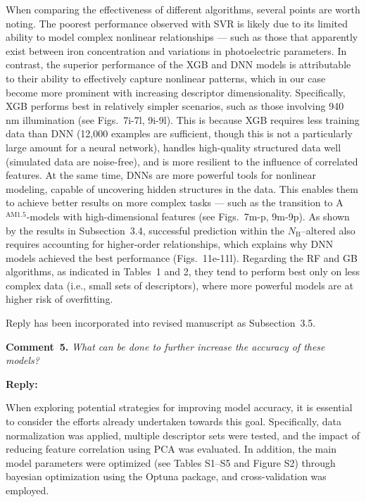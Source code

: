 \documentclass[a4paper,fleqn]{cas-sc}
\begin{document}
When comparing the effectiveness of different algorithms, several points are worth noting.
The poorest performance observed with SVR is likely due to its limited ability
to model complex nonlinear relationships ---
such as those that apparently exist between iron concentration and variations in photoelectric parameters.
In contrast, the superior performance of the XGB and DNN models is attributable to
their ability to effectively capture nonlinear patterns, which in our case become more prominent with increasing descriptor dimensionality.
Specifically, XGB performs best in relatively simpler scenarios, such as those involving 940 nm illumination
(see Figs.~7i-7l, 9i-9l).
This is because XGB requires less training data than DNN
(12,000 examples are sufficient, though this is not a particularly large amount for a neural network),
handles high-quality structured data well (simulated data are noise-free),
and is more resilient to the influence of correlated features.
At the same time, DNNs are more powerful tools for nonlinear modeling,
capable of uncovering hidden structures in the data.
This enables them to achieve better results on more complex tasks ---
such as the transition to A$^\mathrm{AM1.5}$-models with high-dimensional features
(see Figs.~7m-p, 9m-9p).
As shown by the results in Subsection~3.4, successful prediction within the
$N_\mathrm{B}$--altered also requires accounting for higher-order relationships,
which explains why DNN models achieved the best performance (Figs.~11e-11l).
Regarding the RF and GB algorithms, as indicated in Tables~1 and 2,
they tend to perform best only on less complex data
(i.e., small sets of descriptors), where more powerful models are at higher risk of overfitting.

Reply has been incorporated into revised manuscript as Subsection~3.5.

\vspace{1cm}
\noindent
\textcolor[rgb]{0.00,0.50,1.00}{\textbf{Comment~5.}}
\emph{What can be done to further increase the accuracy of these models?}

\noindent
\textcolor[rgb]{0.51,0.00,0.00}{\textbf{Reply:}}

When exploring potential strategies for improving model accuracy, 
it is essential to consider the efforts already undertaken towards this goal.
Specifically, data normalization was applied, 
multiple descriptor sets were tested, and the impact of reducing feature correlation using PCA was evaluated. 
In addition, the main model parameters were optimized (see Tables S1–S5 and Figure S2) 
through bayesian optimization using the Optuna package, and cross-validation was employed.
\end{document}
